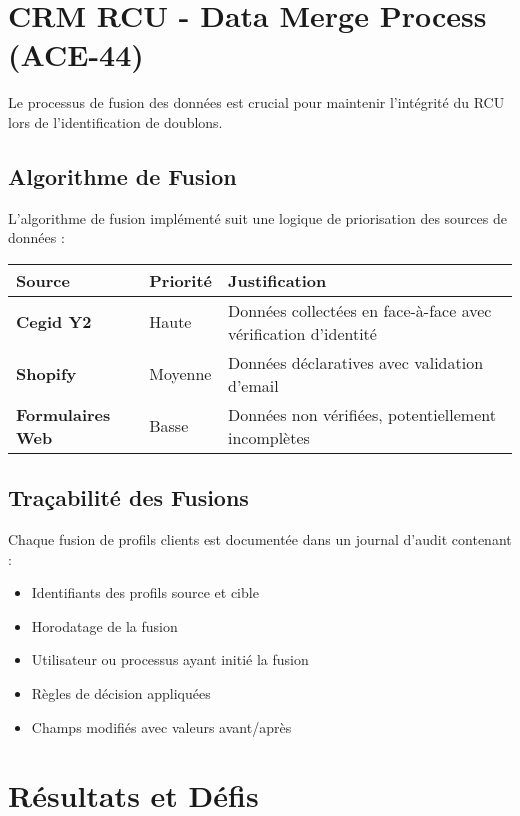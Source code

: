\section{CRM RCU - Data Merge Process (ACE-44)}

Le processus de fusion des données est crucial pour maintenir l'intégrité du RCU lors de l'identification de doublons.

\subsection{Algorithme de Fusion}

L'algorithme de fusion implémenté suit une logique de priorisation des sources de données :

\begin{center}
\begin{tabular}{|>{\bfseries}p{3cm}|p{3cm}|p{7.5cm}|}
\hline
\rowcolor{lightblue} Source & Priorité & Justification \\
\hline
Cegid Y2 & Haute & Données collectées en face-à-face avec vérification d'identité \\
\hline
Shopify & Moyenne & Données déclaratives avec validation d'email \\
\hline
Formulaires Web & Basse & Données non vérifiées, potentiellement incomplètes \\
\hline
\end{tabular}
\end{center}

\subsection{Traçabilité des Fusions}

Chaque fusion de profils clients est documentée dans un journal d'audit contenant :

\begin{itemize}
    \item Identifiants des profils source et cible
    \item Horodatage de la fusion
    \item Utilisateur ou processus ayant initié la fusion
    \item Règles de décision appliquées
    \item Champs modifiés avec valeurs avant/après
\end{itemize}

\section{Résultats et Défis}

